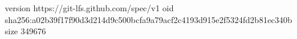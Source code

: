 version https://git-lfs.github.com/spec/v1
oid sha256:a02b39f17f90d3d214d9c500bcfa9a79acf2c4193d915e2f5324fd2b81ec340b
size 349676
